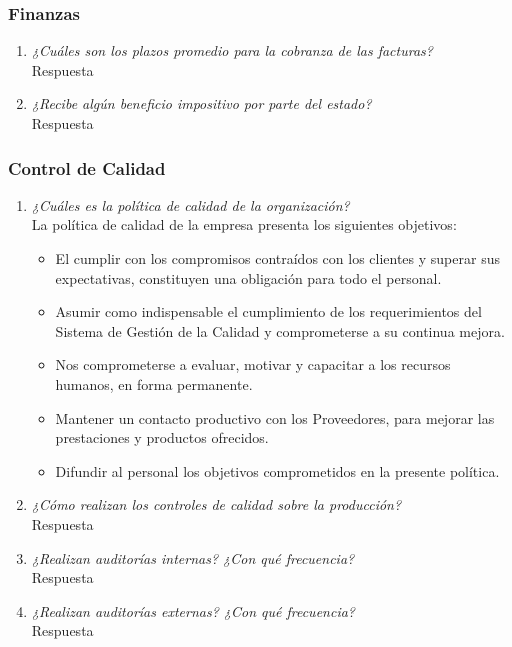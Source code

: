 \documentclass[a4paper,10pt]{article}
\begin{document}
			
		\subsubsection{Finanzas}
		
		
			\begin{enumerate}[resume]
			
			\item \textit{¿Cuáles son los plazos promedio para la cobranza de las facturas?}\\
			
			Respuesta
			
			\item \textit{¿Recibe algún beneficio impositivo por parte del estado?}\\

			Respuesta
			
			\end{enumerate}
		
		\subsubsection{Control de Calidad}
		
		
			\begin{enumerate}[resume]

			\item \textit{¿Cuáles es la política de calidad de la organización?}\\
			La política de calidad de la empresa presenta los siguientes objetivos:
			\begin{itemize}
				\item El cumplir con los compromisos contraídos con los clientes y superar sus expectativas, constituyen una obligación para todo el personal.
				\item Asumir como  indispensable el cumplimiento  de los requerimientos del Sistema de 
Gestión  de la Calidad y comprometerse a su continua mejora.
				\item Nos comprometerse a evaluar, motivar y capacitar a los recursos humanos, en forma 
permanente. 
				\item Mantener un contacto productivo con los Proveedores, para mejorar las prestaciones 
y productos ofrecidos. 
				\item Difundir al personal los objetivos comprometidos en la presente política. 
			\end{itemize}
	
			\item \textit{¿Cómo realizan los controles de calidad sobre la producción?}\\
			
			Respuesta
			
			\item \textit{¿Realizan auditorías internas? ¿Con qué frecuencia?}\\

			Respuesta
			
			\item \textit{¿Realizan auditorías externas? ¿Con qué frecuencia?}\\
			Respuesta
			
			\end{enumerate}	
			
\end{document}
